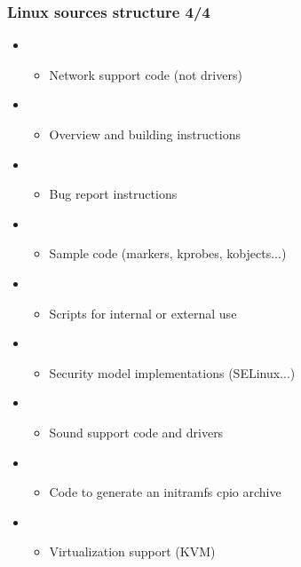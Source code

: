 \begin{frame}
  \frametitle{Linux sources structure 4/4}
  \begin{itemize}
  \item {}
    \begin{itemize}
    \item Network support code (not drivers)
    \end{itemize}
  \item {}
    \begin{itemize}
    \item Overview and building instructions
    \end{itemize}
  \item {}
    \begin{itemize}
    \item Bug report instructions
    \end{itemize}
  \item {}
    \begin{itemize}
    \item Sample code (markers, kprobes, kobjects...)
    \end{itemize}
  \item {}
    \begin{itemize}
    \item Scripts for internal or external use
    \end{itemize}
  \item {}
    \begin{itemize}
    \item Security model implementations (SELinux...)
    \end{itemize}
  \item {}
    \begin{itemize}
    \item Sound support code and drivers
    \end{itemize}
  \item {}
    \begin{itemize}
    \item Code to generate an initramfs cpio archive
    \end{itemize}
  \item {}
    \begin{itemize}
    \item Virtualization support (KVM)
    \end{itemize}
  \end{itemize}
\end{frame}
